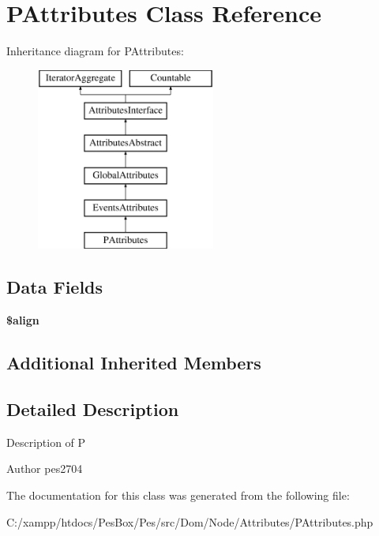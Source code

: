\hypertarget{class_pes_1_1_dom_1_1_node_1_1_attributes_1_1_p_attributes}{}\section{P\+Attributes Class Reference}
\label{class_pes_1_1_dom_1_1_node_1_1_attributes_1_1_p_attributes}
Inheritance diagram for P\+Attributes\+:\begin{figure}[H]
\begin{center}
\leavevmode
\includegraphics[height=6.000000cm]{class_pes_1_1_dom_1_1_node_1_1_attributes_1_1_p_attributes}
\end{center}
\end{figure}
\subsection*{Data Fields}
\begin{DoxyCompactItemize}
\item 
\mbox{\label{class_pes_1_1_dom_1_1_node_1_1_attributes_1_1_p_attributes_a13b48c7a9f88541928ec84660fab1f36}} 
{\bfseries \$align}
\end{DoxyCompactItemize}
\subsection*{Additional Inherited Members}


\subsection{Detailed Description}
Description of P

\begin{DoxyAuthor}{Author}
pes2704 
\end{DoxyAuthor}


The documentation for this class was generated from the following file\+:\begin{DoxyCompactItemize}
\item 
C\+:/xampp/htdocs/\+Pes\+Box/\+Pes/src/\+Dom/\+Node/\+Attributes/P\+Attributes.\+php\end{DoxyCompactItemize}
